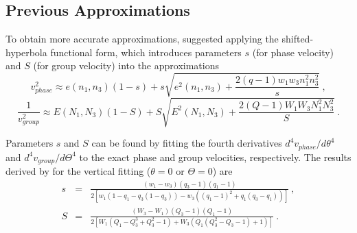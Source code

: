 \subsection{Previous Approximations}

To obtain more accurate approximations, \cite{fomel} suggested applying the shifted-hyperbola functional form, 
which introduces  parameters $s$ (for phase velocity) and $S$ (for group velocity) into the approximations 
\begin{equation}
\label{eq:sphase}
v^2_{phase} \approx e(n_1,n_3)(1-s) + s\sqrt{e^2(n_1,n_3) + \frac{2(q-1)w_1w_3n^2_{1}n^2_{3}}{s}}~,
\end{equation}
\begin{equation}
\label{eq:sgroup}
\frac{1}{v^2_{group}} \approx E(N_1,N_3)(1-S) + S\sqrt{E^2(N_1,N_3) + \frac{2(Q-1)W_1W_3N^2_{1}N^2_{3}}{S}}~.
\end{equation}

Parameters $s$ and $S$ can be found by fitting the fourth derivatives $d^4v_{phase}/d\theta^4$ and $d^4v_{group}/d\Theta^4$ to the exact phase and group velocities, respectively. The results derived by \cite{fomel} for the vertical fitting ($\theta=0$ or $\Theta = 0$) are
\begin{eqnarray}
\label{eq:fomels}
 s & = & \frac{(w_1-w_3)(q_3-1)(q_1-1)}{2[w_1(1-q_1-q_3(1-q_3)) - w_3((q_1-1)^2 + q_1(q_3-q_1))]}~, \\
\label{eq:fomelS}
 S & = & \frac{(W_3-W_1)(Q_3-1)(Q_1-1)}{2[W_1(Q_1-Q^3_3+Q^2_3-1) + W_3(Q_1(Q^2_3-Q_3-1)+1)]}~. 
\end{eqnarray}

